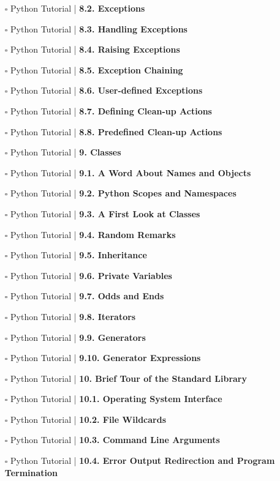 \documentclass[a4, landscape, 12pt]{article}
\newcommand{\checkbox}{$\square$}%
\begin{document}
\begin{itemize}
{}
\item [\checkbox]  Python Tutorial | \textbf{ 8.2. Exceptions
}
\item [\checkbox]  Python Tutorial | \textbf{ 8.3. Handling Exceptions
}
\item [\checkbox]  Python Tutorial | \textbf{ 8.4. Raising Exceptions
}
\item [\checkbox]  Python Tutorial | \textbf{ 8.5. Exception Chaining
}
\item [\checkbox]  Python Tutorial | \textbf{ 8.6. User-defined Exceptions
}
\item [\checkbox]  Python Tutorial | \textbf{ 8.7. Defining Clean-up Actions
}
\item [\checkbox]  Python Tutorial | \textbf{ 8.8. Predefined Clean-up Actions
}
\item [\checkbox]  Python Tutorial | \textbf{ 9. Classes
}
\item [\checkbox]  Python Tutorial | \textbf{ 9.1. A Word About Names and Objects
}
\item [\checkbox]  Python Tutorial | \textbf{ 9.2. Python Scopes and Namespaces
}
\item [\checkbox]  Python Tutorial | \textbf{ 9.3. A First Look at Classes
}
\item [\checkbox]  Python Tutorial | \textbf{ 9.4. Random Remarks
}
\item [\checkbox]  Python Tutorial | \textbf{ 9.5. Inheritance
}
\item [\checkbox]  Python Tutorial | \textbf{ 9.6. Private Variables
}
\item [\checkbox]  Python Tutorial | \textbf{ 9.7. Odds and Ends
}
\item [\checkbox]  Python Tutorial | \textbf{ 9.8. Iterators
}
\item [\checkbox]  Python Tutorial | \textbf{ 9.9. Generators
}
\item [\checkbox]  Python Tutorial | \textbf{ 9.10. Generator Expressions
}
\item [\checkbox]  Python Tutorial | \textbf{ 10. Brief Tour of the Standard Library
}
\item [\checkbox]  Python Tutorial | \textbf{ 10.1. Operating System Interface
}
\item [\checkbox]  Python Tutorial | \textbf{ 10.2. File Wildcards
}
\item [\checkbox]  Python Tutorial | \textbf{ 10.3. Command Line Arguments
}
\item [\checkbox]  Python Tutorial | \textbf{ 10.4. Error Output Redirection and Program Termination
}
\end{itemize}
\end{document}

